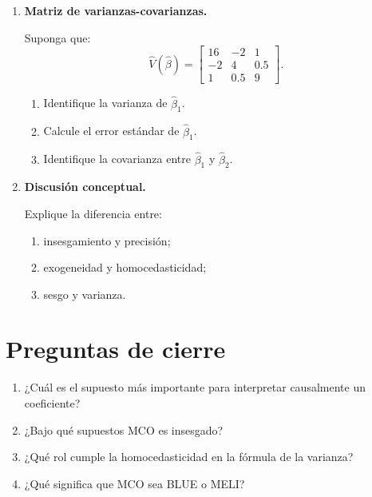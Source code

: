 \documentclass[11pt]{article}
\begin{document}
\begin{enumerate}[label=\textbf{Ejercicio \arabic*.}, leftmargin=*]
\item \textbf{Matriz de varianzas-covarianzas.}

Suponga que:
\[
\hat{V}(\hat{\beta})=
\begin{bmatrix}
16 & -2 & 1\\
-2 & 4 & 0.5\\
1 & 0.5 & 9
\end{bmatrix}.
\]

\begin{enumerate}[label=\alph*)]
    \item Identifique la varianza de \(\hat{\beta}_1\).
    \item Calcule el error estándar de \(\hat{\beta}_1\).
    \item Identifique la covarianza entre \(\hat{\beta}_1\) y \(\hat{\beta}_2\).
\end{enumerate}

\item \textbf{Discusión conceptual.}

Explique la diferencia entre:
\begin{enumerate}[label=\alph*)]
    \item insesgamiento y precisión;
    \item exogeneidad y homocedasticidad;
    \item sesgo y varianza.
\end{enumerate}

\end{enumerate}

\section*{Preguntas de cierre}

\begin{enumerate}[label=\arabic*.]
    \item ¿Cuál es el supuesto más importante para interpretar causalmente un coeficiente?
    \item ¿Bajo qué supuestos MCO es insesgado?
    \item ¿Qué rol cumple la homocedasticidad en la fórmula de la varianza?
    \item ¿Qué significa que MCO sea BLUE o MELI?
\end{enumerate}
\end{document}
